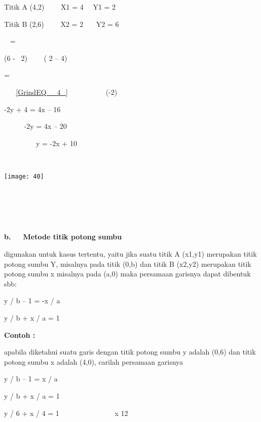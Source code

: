 \documentclass[11pt,fleqn]{book} %
\begin{document}
\begin{myEnumerate}
\begin{itemize}
\noindent Titik A (4,2)~~~~ X1 = 4~~ Y1 = 2

\noindent Titik B (2,6)~~~~ X2 = 2~~~ Y2 = 6

\noindent {}~ =~~

\noindent (6 -~ 2)~~~~ ( 2 -- 4) ~ ~ ~ ~ ~

\noindent {}=~~

\noindent ~ ~ \eqref{GrindEQ__4_}~~~~~~~~~~ (-2)

\noindent -2y + 4 = 4x -- 16

\noindent ~~~~~ -2y = 4x -- 20

\noindent ~~~~~~~~~y = -2x + 10

\noindent ~

\begin{center}
\noindent \texttt{[image: 40]}
\end{center}

\noindent 

\noindent ~ ~ ~ ~ ~ ~ ~ ~ ~ ~ ~ ~ ~ ~ ~ ~ ~ ~ ~ ~ ~ ~ ~ ~ ~ ~ ~ ~ ~ ~ ~ ~ ~ ~ ~ ~ ~ ~ ~ ~ ~ ~ ~ ~ ~ ~ ~ ~~

\noindent ~~~~~~~~~~~~~~~~~~~~~~~~~~~~~~~~~~~~

\noindent \textbf{b.~~~Metode titik potong sumbu}

\noindent \textbf{}

\noindent digunakan untuk kasus tertentu, yaitu jika suatu titik A (x1,y1) merupakan titik potong sumbu Y, misalnya pada titik (0,b) dan titik B (x2,y2) merupakan titik potong sumbu x misalnya pada (a,0) maka persamaan garisnya dapat dibentuk sbb:

\noindent 

\noindent y / b -- 1 = -x / a~~

\noindent y / b + x / a = 1

\noindent 

\noindent \textbf{Contoh :}

\noindent \textbf{}

\noindent apabila diketahui suatu garis dengan titik potong sumbu y adalah (0,6) dan titik potong sumbu x adalah (4,0), carilah persamaan garisnya

\noindent 

\noindent y / b -- 1 = x / a

\noindent y / b + x / a = 1

\noindent y / 6 + x / 4 = 1~~~~~~~~~~~~~~~ x 12


\end{itemize}
\end{myEnumerate}
\end{document}
